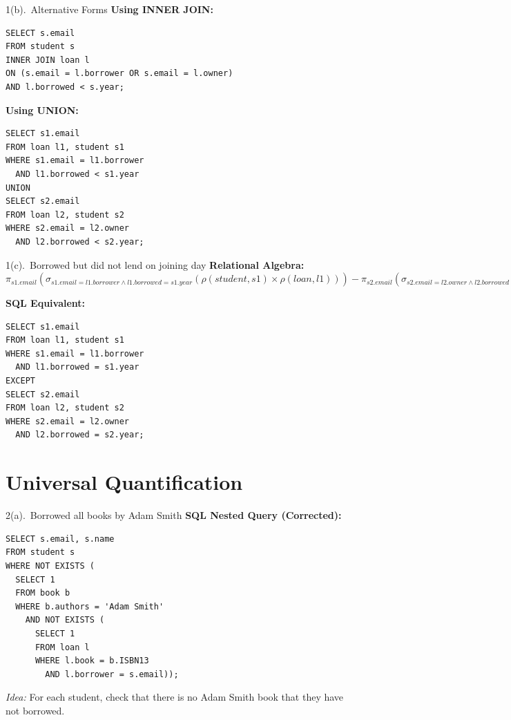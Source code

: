 \documentclass{beamer}
\begin{document}
\begin{frame}[fragile]{1(b).\ Alternative Forms}
\textbf{Using INNER JOIN:}
\begin{lstlisting}
SELECT s.email
FROM student s
INNER JOIN loan l
ON (s.email = l.borrower OR s.email = l.owner)
AND l.borrowed < s.year;
\end{lstlisting}

\textbf{Using UNION:}
\begin{lstlisting}
SELECT s1.email
FROM loan l1, student s1
WHERE s1.email = l1.borrower
  AND l1.borrowed < s1.year
UNION
SELECT s2.email
FROM loan l2, student s2
WHERE s2.email = l2.owner
  AND l2.borrowed < s2.year;
\end{lstlisting}
\end{frame}

\begin{frame}[fragile]{1(c).\ Borrowed but did not lend on joining day}
\textbf{Relational Algebra:}\\
$
\pi_{s1.email}(\sigma_{s1.email=l1.borrower \wedge l1.borrowed=s1.year}
(\rho(student,s1)\times\rho(loan,l1)))
-
\pi_{s2.email}(\sigma_{s2.email=l2.owner \wedge l2.borrowed=s2.year}
(\rho(student,s2)\times\rho(loan,l2)))
$

\textbf{SQL Equivalent:}
\begin{lstlisting}
SELECT s1.email
FROM loan l1, student s1
WHERE s1.email = l1.borrower
  AND l1.borrowed = s1.year
EXCEPT
SELECT s2.email
FROM loan l2, student s2
WHERE s2.email = l2.owner
  AND l2.borrowed = s2.year;
\end{lstlisting}
\end{frame}

\section{Universal Quantification}

\begin{frame}[fragile]{2(a).\ Borrowed all books by Adam Smith}
\textbf{SQL Nested Query (Corrected):}
\begin{lstlisting}
SELECT s.email, s.name
FROM student s
WHERE NOT EXISTS (
  SELECT 1
  FROM book b
  WHERE b.authors = 'Adam Smith'
    AND NOT EXISTS (
      SELECT 1
      FROM loan l
      WHERE l.book = b.ISBN13
        AND l.borrower = s.email));
\end{lstlisting}
\textit{Idea:} For each student, check that there is no Adam Smith book that they have not borrowed.
\end{frame}
\end{document}
